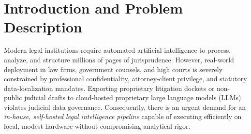\documentclass[11pt, oneside]{article}
\begin{document}
\section{Introduction and Problem Description}
Modern legal institutions require automated artificial intelligence to process, analyze, and structure millions of pages of jurisprudence. However, real-world deployment in law firms, government counsels, and high courts is severely constrained by professional confidentiality, attorney-client privilege, and statutory data-localization mandates. Exporting proprietary litigation dockets or non-public judicial drafts to cloud-hosted proprietary large language models (LLMs) violates judicial data governance. Consequently, there is an urgent demand for an \emph{in-house, self-hosted legal intelligence pipeline} capable of executing efficiently on local, modest hardware without compromising analytical rigor.
\end{document}
